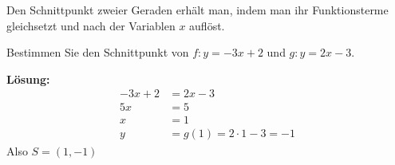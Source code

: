 \begin{fazit}[]{}
    Den Schnittpunkt zweier Geraden erhält man, indem man ihr Funktionsterme gleichsetzt und nach der Variablen $x$ auflöst.
\end{fazit}
\begin{example}
    Bestimmen Sie den Schnittpunkt von $f:y = -3x + 2$ und $g: y = 2x -3$.\\
    \bigskip

    \textbf{Lösung:}
    \begin{align*}
        -3x + 2 & = 2x - 3                  \\
        5x      & = 5                       \\
        x       & =1                        \\
        y       & = g(1) = 2\cdot 1 -3 = -1
    \end{align*}
    Also $S=(1,-1)$
\end{example}
\newpage
